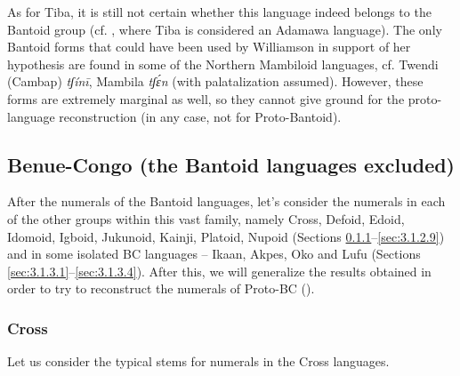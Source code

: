 As for Tiba, it is still not certain whether this language indeed belongs to the Bantoid group (cf. \citealt{Boyd1999}, where Tiba is considered an Adamawa language). The only Bantoid forms that could have been used by Williamson in support of her hypothesis are found in some of the Northern Mambiloid languages, cf. Twendi (Cambap) \textit{tʃín{\={i}}}, Mambila \textit{tʃ{\'{ɛ}}n} (with palatalization assumed). However, these forms are extremely marginal as well, so they cannot give ground for the proto-language reconstruction (in any case, not for Proto-Bantoid).

 
\subsection{Benue-Congo (the Bantoid languages excluded)}
After the numerals of the Bantoid languages, let's consider the numerals in each of the other groups within this vast family, namely Cross, Defoid, Edoid, Idomoid, Igboid, Jukunoid, Kainji, Platoid, Nupoid (Sections \ref{sec:3.1.2.1}--\ref{sec:3.1.2.9}) and in some isolated BC languages – Ikaan, Akpes, Oko and Lufu (Sections \ref{sec:3.1.3.1}--\ref{sec:3.1.3.4}). After this, we will generalize the results obtained in order to try to reconstruct the numerals of Proto-BC ().


\subsubsection{Cross}\label{sec:3.1.2.1}
Let us consider the typical stems for numerals in the Cross languages. 

